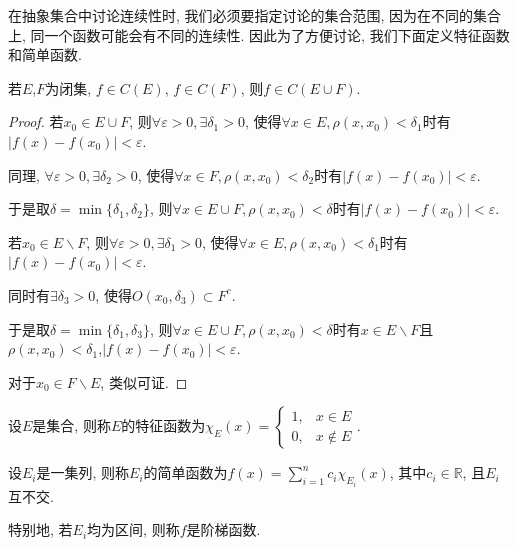 \documentclass[theorem=false,mathfont=none,openany,sub3section]{easybook}
\begin{document}
\begin{remark}
  在抽象集合中讨论连续性时, 我们必须要指定讨论的集合范围, 因为在不同的集合上, 同一个函数可能会有不同的连续性. 因此为了方便讨论, 我们下面定义特征函数和简单函数.\par
\end{remark}

\begin{theorem}
  若$E$,$F$为闭集, $f\in C(E)$, $f\in C(F)$, 则$f\in C(E \cup F)$.\par
\end{theorem}

\begin{proof}
  若$x_0\in E\cup F$, 则$\forall \varepsilon >0, \exists \delta_{1} >0$, 使得$\forall x\in E, \rho(x,x_0)<\delta_{1}$时有$|f(x)-f(x_0)|<\varepsilon$.\par
  同理, $\forall \varepsilon >0, \exists \delta_{2} >0$, 使得$\forall x\in F, \rho(x,x_0)<\delta_{2}$时有$|f(x)-f(x_0)|<\varepsilon$.\par
  于是取$\delta = \min\{\delta_{1},\delta_{2}\}$, 则$\forall x\in E\cup F, \rho(x,x_0)<\delta$时有$|f(x)-f(x_0)|<\varepsilon$.\par
  若$x_0\in E\backslash F$, 则$\forall \varepsilon >0, \exists \delta_{1} >0$, 使得$\forall x\in E, \rho(x,x_0)<\delta_{1}$时有$|f(x)-f(x_0)|<\varepsilon$.\par
  同时有$\exists \delta_{3} >0$, 使得$O(x_0,\delta_{3})\subset F^c$.\par
  于是取$\delta = \min\{\delta_{1},\delta_{3}\}$, 则$\forall x\in E\cup F, \rho(x,x_0)<\delta$时有$x\in E\backslash F$且$\rho(x,x_0)<\delta_{1}$,$|f(x)-f(x_0)|<\varepsilon$.\par
  对于$x_0\in F\backslash E$, 类似可证.\par
\end{proof}

\begin{definition}
  设$E$是集合, 则称$E$的特征函数为$\chi_E(x)=\begin{cases}
    1, & x\in E \\
    0, & x\notin E
  \end{cases}$.\par
  设$E_i$是一集列, 则称$E_i$的简单函数为$f(x)=\sum_{i=1}^{n}c_i\chi_{E_i}(x)$, 其中$c_i\in \mathbb{R}$, 且$E_i$互不交.\par
  特别地, 若$E_i$均为区间, 则称$f$是阶梯函数.\par
\end{definition}
\end{document}
